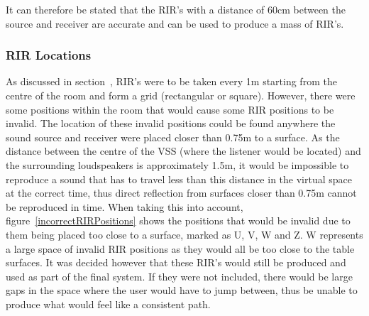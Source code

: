 \documentclass[../../main.tex]{subfiles}
\begin{document}
			It can therefore be stated that the \ac{RIR}'s with a distance of 60cm between the source and receiver are accurate and can be used to produce a mass of \ac{RIR}'s.

		\subsubsection{RIR Locations}
		\label{rirlocations}
			As discussed in section~, \ac{RIR}'s were to be taken every 1m starting from the centre of the room and form a grid (rectangular or square). However, there were some positions within the room that would cause some \ac{RIR} positions to be invalid. The location of these invalid positions could be found anywhere the sound source and receiver were placed closer than 0.75m to a surface. As the distance between the centre of the \ac{VSS} (where the listener would be located) and the surrounding loudspeakers is approximately 1.5m, it would be impossible to reproduce a sound that has to travel less than this distance in the virtual space at the correct time, thus direct reflection from surfaces closer than 0.75m cannot be reproduced in time. When taking this into account, figure~\ref{incorrectRIRPositions} shows the positions that would be invalid due to them being placed too close to a surface, marked as U, V, W and Z. W represents a large space of invalid \ac{RIR} positions as they would all be too close to the table surfaces. It was decided however that these \ac{RIR}'s would still be produced and used as part of the final system. If they were not included, there would be large gaps in the space where the user would have to jump between, thus be unable to produce what would feel like a consistent path.
\end{document}
